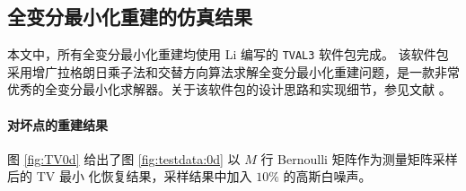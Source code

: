 \subsection{全变分最小化重建的仿真结果}

本文中，所有全变分最小化重建均使用 Li 编写的 \verb|TVAL3| 软件包完成。
该软件包
采用增广拉格朗日乘子法和交替方向算法求解全变分最小化重建问题，是一款非常
优秀的全变分最小化求解器。关于该软件包的设计思路和实现细节，参见文献
\cite{TVAL3CBLMaster} \cite{TVAL3CBLPhD}。

\paragraph{对坏点的重建结果} 图 \ref{fig:TV0d} 给出了图 
\ref{fig:testdata:0d} 以 $M$ 行 Bernoulli 矩阵作为测量矩阵采样后的 TV 最小
化恢复结果，采样结果中加入 $10\%$ 的高斯白噪声。


